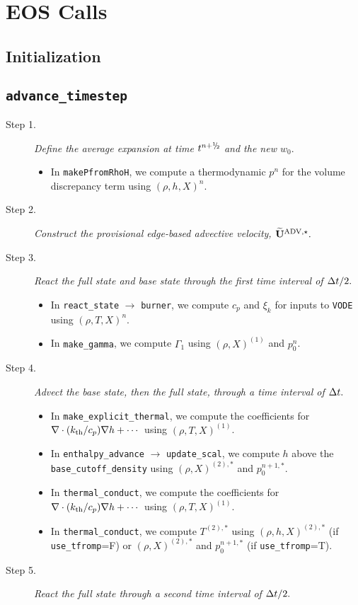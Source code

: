 \section{EOS Calls}
\subsection{Initialization}
\subsection{{\tt advance\_timestep}}
\begin{description}
\item[Step 1.] {\em Define the average expansion at time $t^\nph$ and the new $w_0.$}
\begin{itemize}
\item In {\tt makePfromRhoH}, we compute a thermodynamic $p^n$ for the volume discrepancy 
term using $(\rho,h,X)^n$.
\end{itemize}
\item[Step 2.] {\em Construct the provisional edge-based advective velocity, $\widetilde{\mathbf{U}}^{\mathrm{ADV},\star}.$}
\item[Step 3.] {\em React the full state and base state through the first time interval 
of $\Delta t/2.$}
\begin{itemize}
\item In {\tt react\_state} $\rightarrow$ {\tt burner}, we compute $c_p$ and $\xi_k$ 
for inputs to {\tt VODE} using $(\rho,T,X)^n$.
\item In {\tt make\_gamma}, we compute $\Gamma_1$ using $(\rho,X)^{(1)}$ and $p_0^n$.
\end{itemize}
\item[Step 4.] {\em Advect the base state, then the full state, through a time interval 
of $\Delta t.$}
\begin{itemize}
\item In {\tt make\_explicit\_thermal}, we compute the coefficients for 
$\nabla\cdot(k_{\rm th}/c_p)\nabla h + \cdots$ using $(\rho,T,X)^{(1)}$.
\item In {\tt enthalpy\_advance} $\rightarrow$ {\tt update\_scal}, we compute $h$ above
the {\tt base\_cutoff\_density} using $(\rho,X)^{(2),*}$ and $p_0^{n+1,*}$.
\item In {\tt thermal\_conduct}, we compute the coefficients for 
$\nabla\cdot(k_{\rm th}/c_p)\nabla h + \cdots$ using $(\rho,T,X)^{(1)}$.
\item In {\tt thermal\_conduct}, we compute $T^{(2),*}$ using $(\rho,h,X)^{(2),*}$
(if {\tt use\_tfromp}=F) or $(\rho,X)^{(2),*}$ and $p_0^{n+1,*}$ (if {\tt use\_tfromp}=T).
\end{itemize}
\item[Step 5.] {\em React the full state through a second time interval of $\Delta t/2.$}\\


\end{description}
